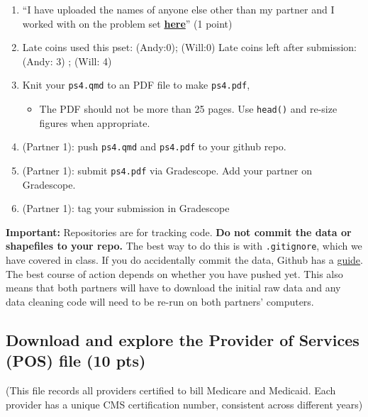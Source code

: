 \documentclass[
  letterpaper,
  DIV=11,
  numbers=noendperiod]{scrartcl}
\providecommand{\tightlist}{%
  \setlength{\itemsep}{0pt}\setlength{\parskip}{0pt}}\usepackage{longtable,booktabs,array}
\begin{document}
\begin{enumerate}
\def\labelenumi{\arabic{enumi}.}
\setcounter{enumi}{4}
\tightlist
\item
  ``I have uploaded the names of anyone else other than my partner and I
  worked with on the problem set
  \textbf{\href{https://docs.google.com/forms/d/185usrCREQaUbvAXpWhChkjghdGgmAZXA3lPWpXLLsts/edit}{here}}''
  (1 point)
\item
  Late coins used this pset: (Andy:0); (Will:0) Late coins left after
  submission: (Andy: 3) ; (Will: 4)
\item
  Knit your \texttt{ps4.qmd} to an PDF file to make \texttt{ps4.pdf},

  \begin{itemize}
  \tightlist
  \item
    The PDF should not be more than 25 pages. Use \texttt{head()} and
    re-size figures when appropriate.
  \end{itemize}
\item
  (Partner 1): push \texttt{ps4.qmd} and \texttt{ps4.pdf} to your github
  repo.
\item
  (Partner 1): submit \texttt{ps4.pdf} via Gradescope. Add your partner
  on Gradescope.
\item
  (Partner 1): tag your submission in Gradescope
\end{enumerate}

\textbf{Important:} Repositories are for tracking code. \textbf{Do not
commit the data or shapefiles to your repo.} The best way to do this is
with \texttt{.gitignore}, which we have covered in class. If you do
accidentally commit the data, Github has a
\href{https://docs.github.com/en/repositories/working-with-files/managing-large-files/about-large-files-on-github\#removing-files-from-a-repositorys-history}{guide}.
The best course of action depends on whether you have pushed yet. This
also means that both partners will have to download the initial raw data
and any data cleaning code will need to be re-run on both partners'
computers.

\subsection{Download and explore the Provider of Services (POS) file (10
pts)}\label{download-and-explore-the-provider-of-services-pos-file-10-pts}

(This file records all providers certified to bill Medicare and
Medicaid. Each provider has a unique CMS certification number,
consistent across different years)
\end{document}

